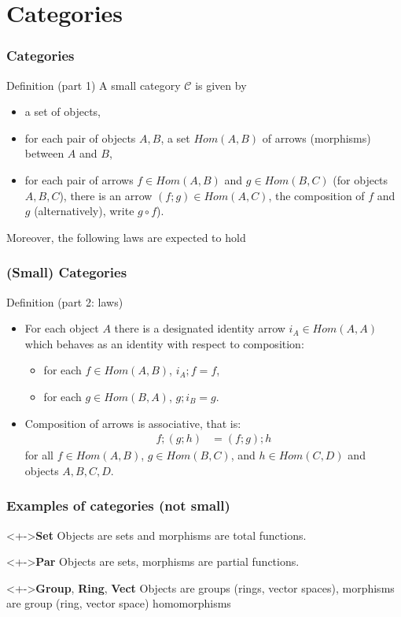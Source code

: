 \documentclass{beamer}
\begin{document}
\section{Categories}
\begin{frame}
  \frametitle{Categories}
  \begin{block}{Definition (part 1)}
    A \alert{small category} $\mathcal C$ is given by
    \begin{itemize}
    \item a set of \alert{objects},
    \item for each pair of objects $A,B$, a set $Hom(A,B)$ of
      \alert{arrows} (morphisms) between $A$ and $B$,
    \item for each pair of arrows $f \in Hom(A,B)$ and $g \in Hom (B,
      C)$ (for objects $A,B,C$), there is an arrow $(f;g) \in Hom (A,
      C)$, the \alert{composition} of $f$ and $g$ (alternatively), write
      $g\circ f$).
    \end{itemize}
    Moreover, the following laws are expected to hold
  \end{block}
\end{frame}
\begin{frame}
  \frametitle{(Small) Categories}
  \begin{block}{Definition (part 2: laws)}
    \begin{itemize}
    \item For each object $A$ there is a designated
      \alert{identity arrow} $i_A \in Hom (A,A) $ which behaves as an
      identity with respect to composition:
      \begin{itemize}
      \item for each $f \in Hom (A, B)$, $i_A;f = f$,
      \item for each $g \in Hom (B, A)$, $g; i_B = g$.
      \end{itemize}
    \item Composition of arrows is associative, that is:
      \begin{align*}
        f; (g; h) &= (f; g); h
      \end{align*}
      for all $f \in Hom (A, B)$, $g \in Hom (B, C)$, and $h \in Hom
      (C, D)$ and objects $A,B,C,D$.
    \end{itemize}
  \end{block}
\end{frame}
\begin{frame}
  \frametitle{Examples of categories (not small)}
  \begin{block}<+->{\textbf{Set}}
    Objects are sets and morphisms are total functions. 
  \end{block}
  \begin{block}<+->{\textbf{Par}}
    Objects are sets, morphisms are partial functions.
  \end{block}
  \begin{block}<+->{\textbf{Group}, \textbf{Ring}, \textbf{Vect}}
    Objects are groups (rings, vector spaces), morphisms are group
    (ring, vector space) homomorphisms
  \end{block}
\end{frame}
\end{document}
